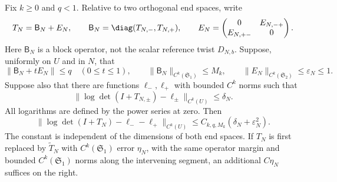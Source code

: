 \begin{proposition}
\label{prop:v76-determinant}
Fix $k\ge0$ and $q<1$.  Relative to two orthogonal end spaces, write
\[
 T_N=\mathsf B_N+E_N,\qquad \mathsf B_N=\diag(T_{N,-},T_{N,+}),\qquad
 E_N=\begin{pmatrix}0&E_{N,-+}\\E_{N,+-}&0\end{pmatrix}.
\]
Here $\mathsf B_N$ is a block operator, not the scalar reference twist
$D_{N,b}$.  Suppose, uniformly on $U$ and in $N$, that
\[
 \|\mathsf B_N+tE_N\|\le q\quad(0\le t\le1),\qquad
 \|\mathsf B_N\|_{C^k(\mathfrak S_1)}\le M_k,\qquad
 \|E_N\|_{C^k(\mathfrak S_2)}\le\varepsilon_N\le1.
\]
Suppose also that there are functions $\ell_-,\ell_+$ with bounded
$C^k$ norms such that
\[
 \|\log\det(I+T_{N,\pm})-\ell_\pm\|_{C^k(U)}
 \le\delta_N.
\]
All logarithms are defined by the power series at zero.  Then
\begin{equation}\label{eq:v76-two-end-determinant}
 \|\log\det(I+T_N)-\ell_--\ell_+\|_{C^k(U)}
 \le C_{k,q,M_k}(\delta_N+\varepsilon_N^2).
\end{equation}
The constant is independent of the dimensions of both end spaces.
If $T_N$ is first replaced by $\widetilde T_N$ with
$C^k(\mathfrak S_1)$ error $\eta_N$, with the same operator margin
and bounded $C^k(\mathfrak S_1)$ norms along the intervening segment,
an additional $C\eta_N$ suffices on the right.
\end{proposition}

